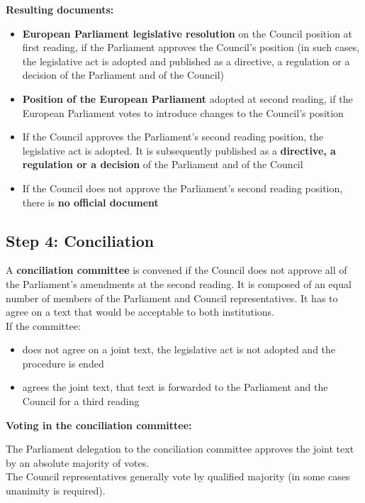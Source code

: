 \textbf{Resulting documents:}
\begin{itemize}
	\item \textbf{European Parliament legislative resolution} on the Council position at first reading, if the Parliament approves the Council's position (in such cases, the legislative act is adopted and published as a directive, a regulation or a decision of the Parliament and of the Council) 
	\item \textbf{Position of the European Parliament} adopted at second reading, if the European Parliament votes to introduce changes to the Council's position
	\item If the Council approves the Parliament's second reading position, the legislative act is adopted. It is subsequently published as a \textbf{directive, a regulation or a decision} of the Parliament and of the Council
	\item If the Council does not approve the Parliament's second reading position, there is \textbf{no official document}
\end{itemize}

\clearpage
\subsection{Step 4: Conciliation}
A \textbf{conciliation committee} is convened if the Council does not approve all of the Parliament's amendments at the second reading. It is composed of an equal number of members of the Parliament and Council representatives. It has to agree on a text that would be acceptable to both institutions. \\

If the committee:
\begin{itemize}
	\item does not agree on a joint text, the legislative act is not adopted and the procedure is ended
	\item agrees the joint text, that text is forwarded to the Parliament and the Council for a third reading
\end{itemize}

\textbf{Voting in the conciliation committee:}

The Parliament delegation to the conciliation committee approves the joint text by an absolute majority of votes.
\\

The Council representatives generally vote by qualified majority (in some cases unanimity is required).
\\


